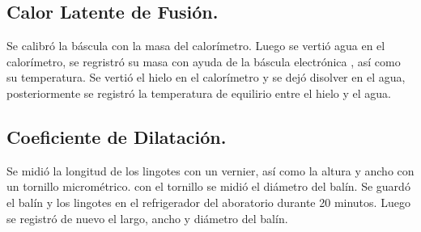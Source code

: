     \subsection{Calor Latente de Fusión.}
        Se calibró la báscula con la masa del calorímetro. Luego se vertió agua en el calorímetro, se regristró su masa con ayuda de la báscula electrónica , así como su temperatura. Se vertió el hielo en el calorímetro y se dejó disolver en el agua, posteriormente se registró la temperatura de equilirio entre el hielo y el agua.
    
    \subsection{Coeficiente de Dilatación.}
        Se midió la longitud de los lingotes con un vernier, así como la altura y ancho con un tornillo micrométrico. con el tornillo se midió el diámetro del balín. Se guardó el balín y los lingotes en el refrigerador del  aboratorio durante 20 minutos. Luego se registró de nuevo el largo, ancho y diámetro del balín. 

